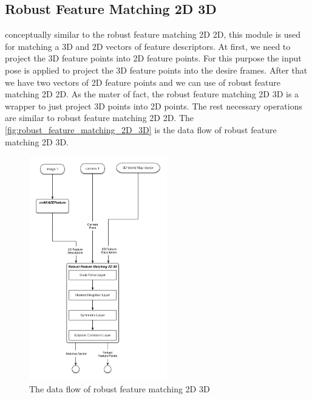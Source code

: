 \subsection {Robust Feature Matching 2D 3D} \label{subsec:robust_feature_matching_2D_3D}
conceptually similar to the robust feature matching 2D 2D, this module is used for matching a 3D and 2D vectors of feature descriptors. At first, we need to project the 3D feature points into 2D feature points. For this purpose the input pose is applied to project the 3D feature points into the desire frames. After that we have two vectors of 2D feature points and we can use of robust feature matching 2D 2D. As the mater of fact, the robust feature matching 2D 3D is a wrapper to just project 3D points into 2D points. The rest necessary operations are similar to robust feature matching 2D 2D. The \autoref{fig:robust_feature_matching_2D_3D} is the data flow of robust feature matching 2D 3D.
\begin{figure}[H]
  \centering
  \includegraphics[width=60mm]{figures/robust_feature_matching_2D_3D}
  \caption{The data flow of robust feature matching 2D 3D}\label{fig:robust_feature_matching_2D_3D}
\end{figure}

